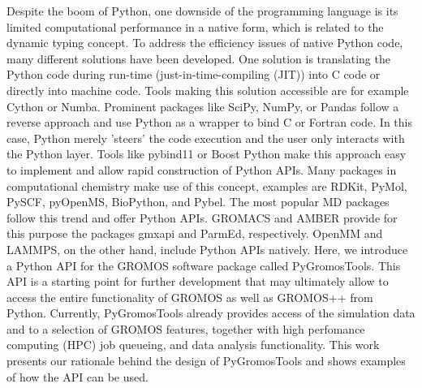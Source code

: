 Despite the boom of Python, one downside of the programming language is its limited computational performance in a native form, which is related to the dynamic typing concept. To address the efficiency issues of native Python code, many different solutions have been developed. One solution is translating the Python code during run-time (just-in-time-compiling (JIT)) into C code\cite{Kernighan2006} or directly into machine code\cite{Lattner2008}. Tools making this solution accessible are for example Cython\cite{Behnel2011} or Numba\cite{Lam2015}. 
Prominent packages like SciPy\cite{Vanderwalt2011}, NumPy\cite{Virtanen2020}, or Pandas\cite{Mckinney2010} follow a reverse approach and use Python as a wrapper to bind C\cite{Kernighan2006} or Fortran\cite{Backus1957} code. In this case, Python merely 'steers' the code execution and the user only interacts with the Python layer.\cite{Oliphant2007} 
Tools like pybind11\cite{Wenzel2017} or Boost Python\cite{Koranne2011} make this approach easy to implement and allow rapid construction of Python APIs. 
Many packages in computational chemistry make use of this concept, examples are RDKit\cite{Landrum2021}, PyMol\cite{Delano2020}, PySCF\cite{Sun2018}, pyOpenMS\cite{Röst2014}, BioPython\cite{Cock2009}, and Pybel\cite{O'Boyle2008}. The most popular MD packages follow this trend and offer Python APIs. GROMACS \cite{Berendsen1995, Lindahl2001, Vanderspoel2005, Hess2008, Pall2015, Pronk2013, Abraham2015} and AMBER\cite{Weiner1981, Pearlman1995, Case2005} provide for this purpose the packages gmxapi\cite{Irrgang2018} and ParmEd\cite{Shirts2017}, respectively. OpenMM\cite{Friedrichs2009, Eastman2010, Eastman2017} and LAMMPS,\cite{plimpton1995, Thompson2022} on the other hand, include Python APIs natively.\cite{Talirz2021}
Here, we introduce a Python API for the GROMOS software package \cite{Schmid2012} called PyGromosTools.\cite{Lehner2021} This API is a starting point for further development that may ultimately allow to access the entire functionality of GROMOS as well as GROMOS++ \cite{Eichenberger2011} from Python. Currently, PyGromosTools already provides access of the simulation data and to a selection of GROMOS features, together with high perfomance computing (HPC) job queueing, and data analysis functionality. This work presents our rationale behind the design of PyGromosTools and shows examples of how the API can be used.



\FloatBarrier